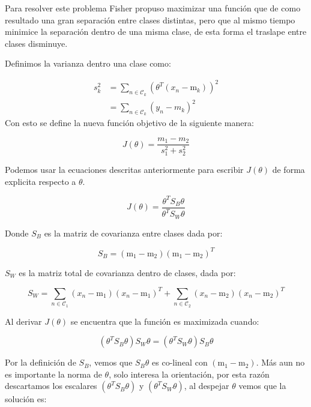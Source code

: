 Para resolver este problema Fisher propuso maximizar una función que de como resultado una gran separación entre clases distintas, pero que al mismo tiempo minimice la separación dentro de una misma clase, de esta forma el traslape entre clases disminuye. 

Definimos la varianza dentro una clase como:

\begin{align}
    s_k^2 &= \sum_{n\in \mathcal{C}_k}(\theta^T(x_n-\text{m}_k))^2\\
    &= \sum_{n\in \mathcal{C}_k}(y_n-m_k)^2
\end{align}
Con esto se define la nueva función objetivo de la siguiente manera:

\begin{equation}
J(\theta) = \frac{m_1-m_2}{s_1^2+s_2 ^2}
\end{equation}

Podemos usar la ecuaciones descritas anteriormente para escribir $J(\theta)$ de forma explicita respecto a $\theta$.

\begin{equation}
    J(\theta) = \frac{\theta^TS_B\theta}{\theta^TS_W\theta}
\end{equation}

Donde $S_B$ es la matriz de covarianza entre clases dada por:

\begin{equation}
    S_B = (\text{m}_1-\text{m}_2)(\text{m}_1-\text{m}_2)^T
\end{equation}

$S_W$ es la matriz total de covarianza dentro de clases, dada por:

\begin{equation}
    S_W = \sum_{n\in \mathcal{C}_1}(x_n-\text{m}_1)(x_n-\text{m}_1)^T+
    \sum_{n\in \mathcal{C}_2}(x_n-\text{m}_2)(x_n-\text{m}_2)^T
\end{equation}

Al derivar $J(\theta)$ se encuentra que la función es maximizada cuando:

\begin{equation}
    (\theta^TS_B\theta)S_W\theta = (\theta^TS_W\theta)S_B\theta
\end{equation}

Por la definición de $S_B$, vemos que $S_B\theta$ es co-lineal con $(\text{m}_1-\text{m}_2)$. Más aun no es importante la norma de $\theta$, solo interesa la orientación, por esta razón descartamos los escalares $(\theta^TS_B\theta)$ y $(\theta^TS_W\theta)$, al despejar $\theta$ vemos que la solución es:

